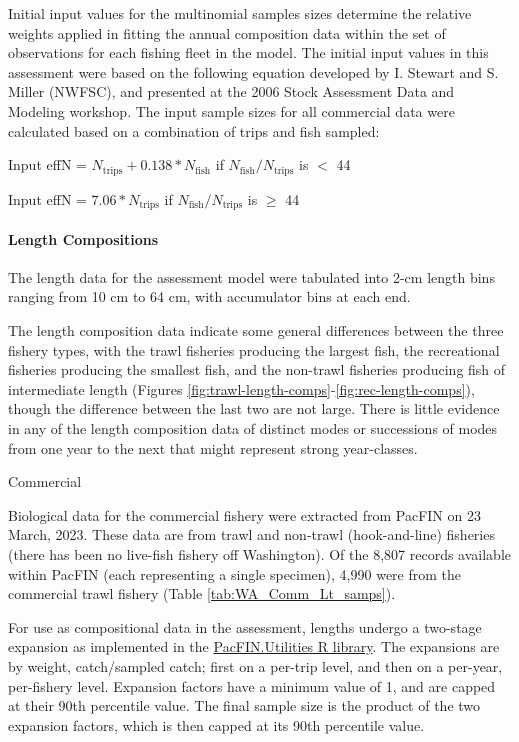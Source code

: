 \documentclass[11pt,
  english,
  letterpaper,
]{article}
\begin{document}
Initial input values for the multinomial samples sizes determine the relative weights applied in fitting the annual composition data within the set of observations for each fishing fleet in the model. The initial input values in this assessment were based on the following equation developed by I. Stewart and S. Miller (NWFSC), and presented at the 2006 Stock Assessment Data and Modeling workshop. The input sample sizes for all commercial data were calculated based on a combination of trips and fish sampled:

\begin{centering}

Input effN = $N_{\text{trips}} + 0.138 * N_{\text{fish}}$ if $N_{\text{fish}}/N_{\text{trips}}$ is $<$ 44

Input effN = $7.06 * N_{\text{trips}}$ if $N_{\text{fish}}/N_{\text{trips}}$ is $\geq$ 44

\end{centering}

\hypertarget{length-compositions}{%
\paragraph{Length Compositions}\label{length-compositions}}

The length data for the assessment model were tabulated into 2-cm length bins ranging from 10 cm to 64 cm, with accumulator bins at each end.

The length composition data indicate some general differences between the three fishery types, with the trawl fisheries producing the largest fish, the recreational fisheries producing the smallest fish, and the non-trawl fisheries producing fish of intermediate length (Figures \ref{fig:trawl-length-comps}-\ref{fig:rec-length-comps}), though the difference between the last two are not large. There is little evidence in any of the length composition data of distinct modes or successions of modes from one year to the next that might represent strong year-classes.

Commercial

Biological data for the commercial fishery were extracted from PacFIN on 23 March, 2023. These data are from trawl and non-trawl (hook-and-line) fisheries (there has been no live-fish fishery off Washington). Of the 8,807 records available within PacFIN (each representing a single specimen), 4,990 were from the commercial trawl fishery (Table \ref{tab:WA_Comm_Lt_samps}).

For use as compositional data in the assessment, lengths undergo a two-stage expansion as implemented in the \href{https://github.com/pfmc-assessments/PacFIN.Utilities}{PacFIN.Utilities R library}. The expansions are by weight, catch/sampled catch; first on a per-trip level, and then on a per-year, per-fishery level. Expansion factors have a minimum value of 1, and are capped at their 90th percentile value. The final sample size is the product of the two expansion factors, which is then capped at its 90th percentile value.
\end{document}
